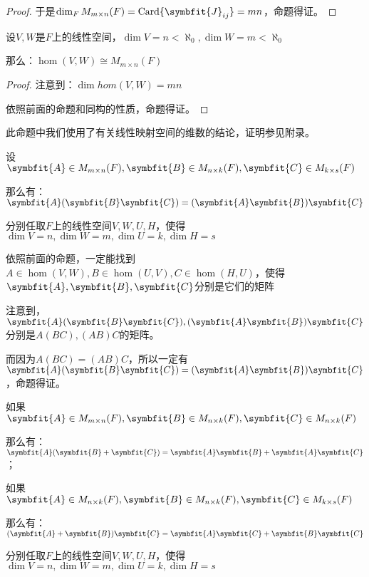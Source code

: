 \documentclass[12pt, a4paper, oneside, UTF8]{ctexbook}
\begin{document}
\begin{para}{0}
\begin{proof}
						于是$\dim_F M_{m \times n}(F)=\card \{\symbfit{J}_{ij}\}=mn$，命题得证。
					\end{proof}
				\point{}
					\begin{proposition}
						设$V,W$是$F$上的线性空间，$\dim V = n < \aleph_0,\dim W = m < \aleph_0$

						那么：$\hom(V,W) \cong M_{m \times n}(F)$
					\end{proposition}
					\begin{proof}
						注意到：$\dim hom(V,W)=mn$

						依照前面的命题和同构的性质，命题得证。
					\end{proof}
					此命题中我们使用了有关线性映射空间的维数的结论，证明参见附录。
					\begin{proposition}
						设$\symbfit{A} \in M_{m \times n}(F),\symbfit{B} \in M_{n \times k}(F),\symbfit{C} \in M_{k \times s}(F)$

						那么有：$\symbfit{A}(\symbfit{B}\symbfit{C})=(\symbfit{A}\symbfit{B})\symbfit{C}$
					\end{proposition}
					\begin{proposition}
						分别任取$F$上的线性空间$V,W,U,H$，使得$\dim V = n,\dim W=m,\dim U = k ,\dim H = s$

						依照前面的命题，一定能找到$A \in \hom(V,W),B \in \hom(U,V),C \in \hom(H,U)$，使得$\symbfit{A},\symbfit{B},\symbfit{C}$分别是它们的矩阵

						注意到，$\symbfit{A}(\symbfit{B}\symbfit{C}),(\symbfit{A}\symbfit{B})\symbfit{C}$分别是$A(BC),(AB)C$的矩阵。
						
						而因为$A(BC)=(AB)C$，所以一定有$\symbfit{A}(\symbfit{B}\symbfit{C})=(\symbfit{A}\symbfit{B})\symbfit{C}$，命题得证。
					\end{proposition}
					\begin{proposition}
						如果$\symbfit{A} \in M_{m \times n}(F),\symbfit{B} \in M_{n \times k}(F),\symbfit{C} \in M_{n \times k}(F)$

						那么有：$\symbfit{A}(\symbfit{B}+\symbfit{C})=\symbfit{A}\symbfit{B}+\symbfit{A}\symbfit{C}$；

						如果$\symbfit{A} \in M_{n \times k}(F),\symbfit{B} \in M_{n \times k}(F),\symbfit{C} \in M_{k \times s}(F)$

						那么有：$(\symbfit{A}+\symbfit{B})\symbfit{C}=\symbfit{A}\symbfit{C}+\symbfit{B}\symbfit{C}$
					\end{proposition}
					\begin{proposition}
						分别任取$F$上的线性空间$V,W,U,H$，使得$\dim V = n,\dim W=m,\dim U = k ,\dim H = s$


\end{proposition}
\end{para}
\end{document}
